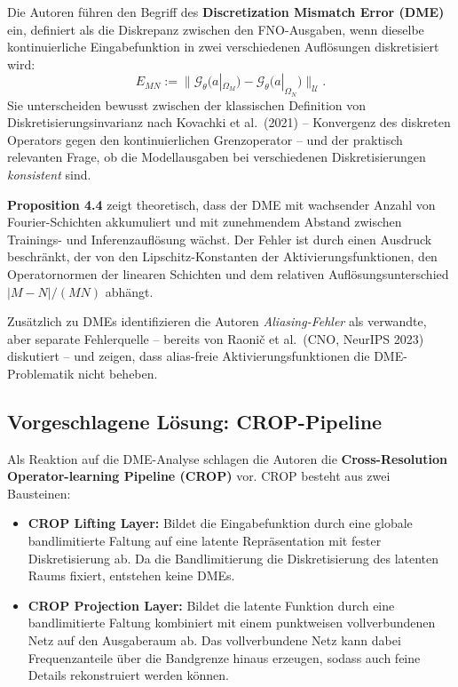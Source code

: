 \documentclass[a4paper,12pt]{article}
\begin{document}
Die Autoren f\"uhren den Begriff des \textbf{Discretization Mismatch Error
(DME)} ein, definiert als die Diskrepanz zwischen den FNO-Ausgaben, wenn
dieselbe kontinuierliche Eingabefunktion in zwei verschiedenen Aufl\"osungen
diskretisiert wird:
\[
  E_{MN} := \bigl\| \mathcal{G}_\theta\bigl(a|_{\Omega_M}\bigr)
             - \mathcal{G}_\theta\bigl(a|_{\Omega_N}\bigr) \bigr\|_{\mathcal{U}}.
\]
Sie unterscheiden bewusst zwischen der klassischen Definition von
Diskretisierungsinvarianz nach Kovachki et al.\ (2021) -- Konvergenz des
diskreten Operators gegen den kontinuierlichen Grenzoperator -- und der
praktisch relevanten Frage, ob die Modellausgaben bei verschiedenen
Diskretisierungen \emph{konsistent} sind.

\textbf{Proposition 4.4} zeigt theoretisch, dass der DME mit wachsender
Anzahl von Fourier-Schichten akkumuliert und mit zunehmendem Abstand
zwischen Trainings- und Inferenzaufl\"osung w\"achst. Der Fehler ist durch
einen Ausdruck beschr\"ankt, der von den Lipschitz-Konstanten der
Aktivierungsfunktionen, den Operatornormen der linearen Schichten und
dem relativen Aufl\"osungsunterschied $|M - N|/(MN)$ abh\"angt.

Zus\"atzlich zu DMEs identifizieren die Autoren \emph{Aliasing-Fehler} als
verwandte, aber separate Fehlerquelle -- bereits von Raoni\v{c} et al.\
(CNO, NeurIPS 2023) diskutiert -- und zeigen, dass alias-freie
Aktivierungsfunktionen die DME-Problematik nicht beheben.

\subsection*{Vorgeschlagene L\"osung: CROP-Pipeline}

Als Reaktion auf die DME-Analyse schlagen die Autoren die
\textbf{Cross-Resolution Operator-learning Pipeline (CROP)} vor. CROP
besteht aus zwei Bausteinen:

\begin{itemize}
  \item \textbf{CROP Lifting Layer:} Bildet die Eingabefunktion durch eine
    globale bandlimitierte Faltung auf eine latente Repr\"asentation mit
    fester Diskretisierung ab. Da die Bandlimitierung die Diskretisierung
    des latenten Raums fixiert, entstehen keine DMEs.

  \item \textbf{CROP Projection Layer:} Bildet die latente Funktion durch
    eine bandlimitierte Faltung kombiniert mit einem punktweisen
    vollverbundenen Netz auf den Ausgaberaum ab. Das vollverbundene Netz
    kann dabei Frequenzanteile \"uber die Bandgrenze hinaus erzeugen,
    sodass auch feine Details rekonstruiert werden k\"onnen.
\end{itemize}
\end{document}
